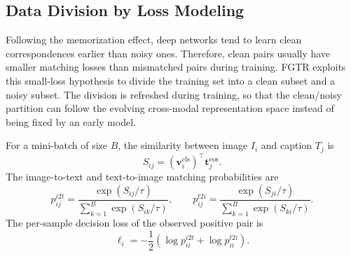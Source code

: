 \subsection{Data Division by Loss Modeling}
Following the memorization effect, deep networks tend to learn clean correspondences earlier than noisy ones. Therefore, clean pairs usually have smaller matching losses than mismatched pairs during training. FGTR exploits this small-loss hypothesis to divide the training set into a clean subset and a noisy subset. The division is refreshed during training, so that the clean/noisy partition can follow the evolving cross-modal representation space instead of being fixed by an early model.

For a mini-batch of size $B$, the similarity between image $I_i$ and caption $T_j$ is
\begin{equation}
    S_{ij}=(\boldsymbol{v}_{i}^{\mathrm{cls}})^{\top}\boldsymbol{t}_{j}^{\mathrm{eos}}.
\end{equation}
The image-to-text and text-to-image matching probabilities are
\begin{equation}
    p_{ij}^{i2t}=
    \frac{\exp(S_{ij}/\tau)}
    {\sum_{k=1}^{B}\exp(S_{ik}/\tau)},
    \qquad
    p_{ij}^{t2i}=
    \frac{\exp(S_{ji}/\tau)}
    {\sum_{k=1}^{B}\exp(S_{ki}/\tau)}.
\end{equation}
The per-sample decision loss of the observed positive pair is
\begin{equation}
    \ell_i
    =
    -\frac{1}{2}
    \left(
    \log p_{ii}^{i2t}+\log p_{ii}^{t2i}
    \right).
\end{equation}

